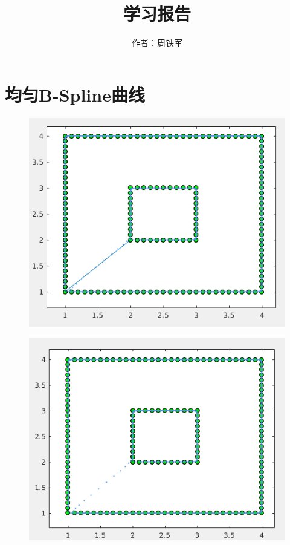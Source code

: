 \documentclass[12pt,a4paper]{article}
\title{学习报告}
\author{作者：周铁军}
\date{\chntoday}
\begin{document}
\maketitle
\newpage


\section{均匀B-Spline曲线}
\begin{figure}[ht]
	\centering
	\includegraphics[scale=0.6]{./figures/1.png}
	\caption{}
	\label{fig:label}	
\end{figure}
\begin{figure}[ht]
	\centering
	\includegraphics[scale=0.6]{./figures/2.png}
	\caption{}
	\label{fig:label}	
\end{figure}
\end{document}
